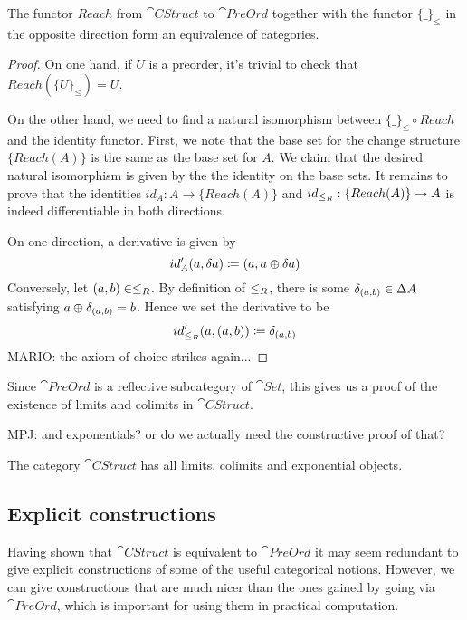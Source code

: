 \begin{thm}
  The functor $Reach$ from $\cat{CStruct}$ to $\cat{PreOrd}$ together with the 
  functor $\{\_\}_\leq$ in the opposite direction form an equivalence of categories.
\end{thm}
\begin{proof}
  On one hand, if $U$ is a preorder, it's trivial to check that $Reach (\{U\}_\leq) = U$.

  On the other hand, we need to find a natural isomorphism between $\{\_\}_\leq \circ Reach$
  and the identity functor. First, we note that the base set for the change structure $\{Reach(A)\}$ is
  the same as the base set for $A$. We claim that the desired natural isomorphism is given by the
  the identity on the base sets. It remains to prove that the identities
  $id_A : A \rightarrow \{Reach(A)\}$ and $id_{\leq_R} : \{Reach(A)\} \rightarrow A$
  is indeed differentiable in both directions.

  On one direction, a derivative is given by
  $$
    id'_A(a, \delta a) \coloneqq (a, a \oplus \delta a)
  $$
  Conversely, let $(a, b) \in \leq_R$. By definition of $\leq_R$, there is some
  $\delta_{(a, b)} \in \Delta A$ satisfying $a \oplus \delta_{(a,b)} = b$. Hence we set the
  derivative to be
  $$
    id'_{\leq_R}(a, (a, b)) \coloneqq \delta_{(a, b)}
  $$
  MARIO: the axiom of choice strikes again...
\end{proof}

Since $\cat{PreOrd}$ is a reflective subcategory of $\cat{Set}$, this gives us a proof
of the existence of limits and colimits in $\cat{CStruct}$.

MPJ: and exponentials? or do we actually need the constructive proof of that?

\begin{corollary}
  The category $\cat{CStruct}$ has all limits, colimits and exponential objects. 
\end{corollary}

\subsection{Explicit constructions}

Having shown that $\cat{CStruct}$ is equivalent to $\cat{PreOrd}$ it may seem
redundant to give explicit constructions of some of the useful categorical
notions. However, we can give constructions that are much nicer than the ones
gained by going via $\cat{PreOrd}$, which is important for using them in
practical computation.

